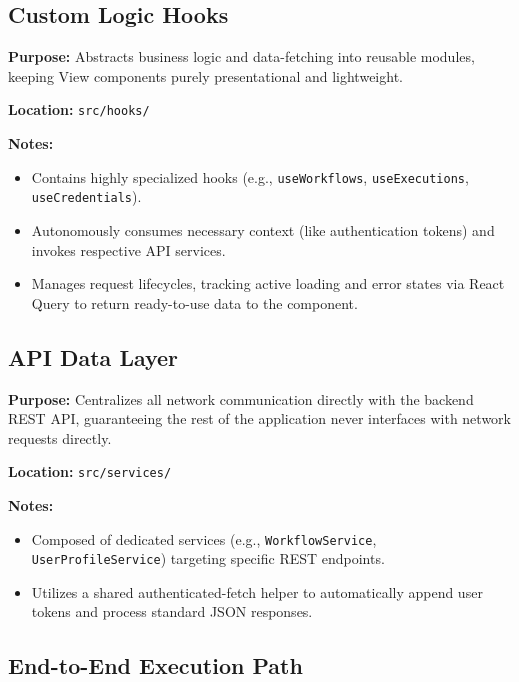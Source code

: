 \subsection{Custom Logic Hooks}

\textbf{Purpose:} Abstracts business logic and data-fetching into reusable modules, keeping View components purely presentational and lightweight.

\vspace{0.2cm}
\noindent\textbf{Location:} \texttt{src/hooks/}

\vspace{0.2cm}
\noindent\textbf{Notes:}
\begin{itemize}
    \item Contains highly specialized hooks (e.g., \texttt{useWorkflows}, \texttt{useExecutions}, \texttt{useCredentials}).
    \item Autonomously consumes necessary context (like authentication tokens) and invokes respective API services.
    \item Manages request lifecycles, tracking active loading and error states via React Query to return ready-to-use data to the component.
\end{itemize}

\subsection{API Data Layer}

\textbf{Purpose:} Centralizes all network communication directly with the backend REST API, guaranteeing the rest of the application never interfaces with network requests directly.

\vspace{0.2cm}
\noindent\textbf{Location:} \texttt{src/services/}

\vspace{0.2cm}
\noindent\textbf{Notes:}
\begin{itemize}
    \item Composed of dedicated services (e.g., \texttt{WorkflowService}, \texttt{UserProfileService}) targeting specific REST endpoints.
    \item Utilizes a shared authenticated-fetch helper to automatically append user tokens and process standard JSON responses.
\end{itemize}

\subsection{End-to-End Execution Path}

